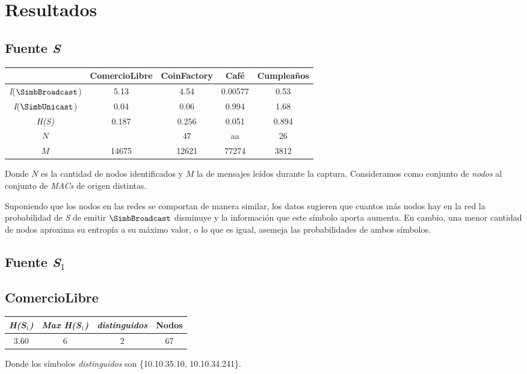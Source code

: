\section{\textbf{Resultados}}

\subsection{\textbf{Fuente \textit{S}}}

\begin{center}\small
	\begin{tabular}{ c | c | c | c | c }
	   & ComercioLibre & CoinFactory & Café & Cumpleaños \\ \hline
	  \textit{I}($\SimbBroadcast$) & 5.13 & 4.54 & 0.00577 & 0.53 \\ 
	  \textit{I}($\SimbUnicast$) & 0.04 & 0.06 & 0.994 & 1.68 \\ 
	  \textit{H(S)} & 0.187 & 0.256 & 0.051 & 0.894 \\ 
	  $N$ &  & 47 & aa & 26 \\ 
	  $M$ & 14675 & 12621 & 77274 & 3812 \\
	\end{tabular}
\end{center}

Donde $N$ es la cantidad de nodos identificados y $M$ la de mensajes leídos durante la captura. Consideramos como conjunto de \textit{nodos} al conjunto de \textit{MACs} de origen distintas.

Suponiendo que los nodos en las redes se comportan de manera similar, los datos sugieren que cuantos más nodos hay en la red la probabilidad de \textit{S} de emitir $\SimbBroadcast$ disminuye y la información que este símbolo aporta aumenta. En cambio, una menor cantidad de nodos aproxima su entropía a su máximo valor, o lo que es igual, asemeja las probabilidades de ambos símbolos.

\subsection{\textbf{Fuente \textit{S}$_1$}}

\subsection*{\textbf{ComercioLibre}}

\begin{center}\small
	\begin{tabular}{ c | c | c | c }
	  \textit{H(S$_1$)} & \textit{Max H(S$_1$)} & \textbar \textit{distinguidos}\textbar & \textbar Nodos\textbar \\
	  \hline
	  3.60 & 6 & 2 & 67 \\
	\end{tabular}
\end{center}
Donde los símbolos \textit{distinguidos} son \{10.10.35.10, 10.10.34.241\}.

